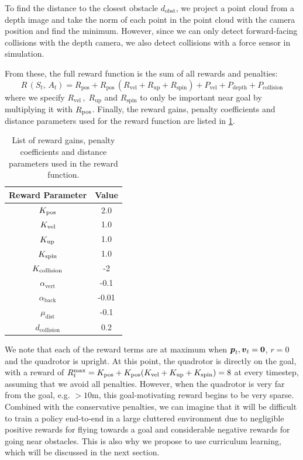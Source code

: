 To find the distance to the closest obstacle $d_\text{obst}$, we project a point cloud from a depth image and take the norm of each point in the point cloud with the camera position and find the minimum. However, since we can only detect forward-facing collisions with the depth camera, we also detect collisions with a force sensor in simulation. 

From these, the full reward function is the sum of all rewards and penalties:
\begin{equation}
    R\,(S_t, \,A_t) = R_{\text{pos}} + R_{\text{pos}} \, (R_{\text{vel}} + R_{\text{up}} + R_{\text{spin}}) + P_{\text{vel}} + P_{\text{depth}} + P_{\text{collision}}
\end{equation}
where we specify $R_{\text{vel}}\,,\; R_{\text{up}}$ and $R_{\text{spin}}$ to only be important near goal by multiplying it with $R_{\text{pos}}$.
Finally, the reward gains, penalty coefficients and distance parameters used for the reward function are listed in \cref{table:5_reward_parameters}.
\begin{table}[hbt]
    \renewcommand{\arraystretch}{1.0}
    \centering
    \begin{tabular}{||c|c||}
    \hline
    \centering
        Reward Parameter & Value \\ \hline \hline
        $K_{\text{pos}}$ & 2.0 \\  
        $K_{\text{vel}}$ & 1.0 \\ 
        $K_{\text{up}}$ & 1.0 \\ 
        $K_{\text{spin}}$ & 1.0 \\ 
        $K_{\text{collision}}$ & -2 \\
        $\alpha_{\text{vert}}$ & -0.1 \\ 
        $\alpha_{\text{back}}$ & -0.01 \\ 
        $\mu_{\text{dist}}$ & -0.1 \\ 
        $d_{\text{collision}}$ & 0.2 \\ \hline
    \end{tabular}
    \caption{List of reward gains, penalty coefficients and distance parameters used in the reward function.}
     \label{table:5_reward_parameters}
\end{table}

We note that each of the reward terms are at maximum when ${\boldsymbol{p}}_t, {\boldsymbol{v}}_t = \boldsymbol{0}$, $r = 0$ and the quadrotor is upright. At this point, the quadrotor is directly on the goal, with a reward of $R_t^\text{max} = K_{\text{pos}} + K_{\text{pos}}(K_{\text{vel}} + K_{\text{up}} + K_{\text{spin}}) = 8$ at every timestep, assuming that we avoid all penalties. However, when the quadrotor is very far from the goal, e.g. $>10$m, this goal-motivating reward begins to be very sparse. Combined with the conservative penalties, we can imagine that it will be difficult to train a policy end-to-end in a large cluttered environment due to negligible positive rewards for flying towards a goal and considerable negative rewards for going near obstacles.
This is also why we propose to use curriculum learning, which will be discussed in the next section.

